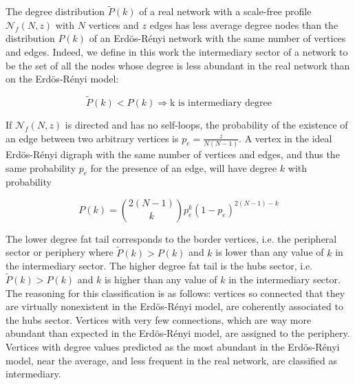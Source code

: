 The degree distribution $\widetilde{P}(k)$ of a real network with a scale-free profile $\mathcal{N}_f(N,z)$ with $N$ vertices and $z$ edges has less
average degree nodes than the distribution $P(k)$ of an Erd\"os-R\'enyi
network with the same number of vertices and edges. Indeed, we define in this work the intermediary sector of a network to be the set of all the nodes whose degree is less abundant in the real network than on the Erd\"os-R\'enyi model:

\begin{equation}\label{criterio}
\widetilde{P}(k)<P(k) \Rightarrow \text{k is intermediary degree}
\end{equation}

If $\mathcal{N}_f(N,z)$ is directed and has no self-loops, the probability of the existence
of an edge between two arbitrary vertices is $p_e=\frac{z}{N(N-1)}$.
A vertex in the ideal Erd\"os-R\'enyi digraph with the same number of vertices and edges, and thus the same probability $p_e$ for the presence of an edge, will have degree $k$ with probability

\begin{equation}
P(k)=\binom{2(N-1)}{k}p_e^k(1-p_e)^{2(N-1)-k}
\end{equation}

The lower degree fat tail corresponds to the border vertices, i.e. the peripheral sector or periphery where $\widetilde{P}(k)>P(k)$ and $k$ is lower than any value of $k$ in the intermediary sector.
The higher degree fat tail is the hubs sector, i.e. $\widetilde{P}(k)>P(k)$ and $k$ is higher than any value of $k$ in the intermediary sector. The reasoning for this classification is as follows: vertices so connected that they are virtually nonexistent in the Erd\"os-R\'enyi model, are coherently associated to the hubs sector.
Vertices with very few connections, which are way more abundant than expected in the Erd\"os-R\'enyi model,
are assigned to the periphery.
Vertices with degree values predicted as the most abundant in the Erd\"os-R\'enyi model,
near the average, and less frequent in the real network, are classified as intermediary.

